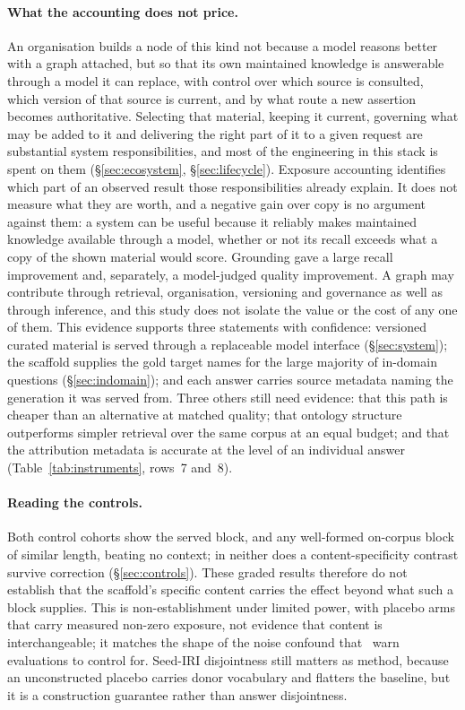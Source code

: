 \documentclass[10pt,twocolumn]{article}
\begin{document}
\paragraph{What the accounting does not price.} An organisation builds a node of this kind not
because a model reasons better with a graph attached, but so that its own maintained knowledge is
answerable through a model it can replace, with control over which source is consulted, which version of that source is current, and
by what route a new assertion becomes authoritative. Selecting that material, keeping it current,
governing what may be added to it and delivering the right part of it to a given request are
substantial system responsibilities, and most of the engineering in this stack is spent on them
(\S\ref{sec:ecosystem}, \S\ref{sec:lifecycle}). Exposure accounting identifies which part of an
observed result those responsibilities already explain. It does not measure what they are worth,
and a negative gain over copy is no argument against them: a system can be useful
because it reliably makes maintained knowledge available through a model, whether or not its recall
exceeds what a copy of the shown material would score. Grounding gave a large recall improvement and,
separately, a model-judged quality improvement. A graph may contribute through retrieval, organisation,
versioning and governance as well as through inference, and this study does not isolate the value or
the cost of any one of them. This evidence supports three statements with confidence: versioned curated material is served through a replaceable model interface
(\S\ref{sec:system}); the scaffold supplies the gold target names for the large majority of
in-domain questions (\S\ref{sec:indomain}); and each answer carries source metadata naming the
generation it was served from. Three others still need evidence: that this path is cheaper than an
alternative at matched quality; that ontology structure outperforms simpler retrieval over the same
corpus at an equal budget; and that the attribution metadata is accurate at
the level of an individual answer (Table~\ref{tab:instruments}, rows~7 and~8).

\paragraph{Reading the controls.} Both control cohorts show the served block, and any well-formed on-corpus block of similar length, beating no context; in neither does a content-specificity contrast survive correction (\S\ref{sec:controls}). These graded results therefore do not establish that the scaffold's specific content carries the effect beyond what such a block supplies. This is non-establishment under limited power, with placebo arms that carry measured non-zero exposure, not evidence that content is interchangeable; it matches the shape of the noise confound that~\textcite{cuconasu2024poweofnoise} warn evaluations to control for. Seed-IRI disjointness still matters as method, because an unconstructed placebo carries donor vocabulary and flatters the baseline, but it is a construction guarantee rather than answer disjointness.
\end{document}
